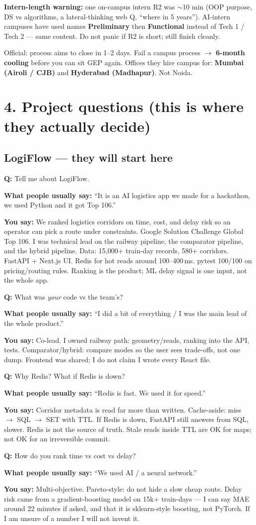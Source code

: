 \documentclass[a4paper,9.5pt]{extarticle}
\newcommand{\Q}[1]{\par\vspace{1.5pt}\noindent\textcolor{hot}{\textbf{Q:} #1}\par}
\newcommand{\Typ}[1]{\noindent\textcolor{muted}{\textbf{What people usually say:} #1}\par}
\newcommand{\Say}[1]{\noindent\textcolor{ok}{\textbf{You say:} #1}\par}
\begin{document}
\textbf{Intern-length warning:} one on-campus intern R2 was $\sim$10 min (OOP purpose, DS vs algorithms, a lateral-thinking web Q, ``where in 5 years''). AI-intern campuses have used names \textbf{Preliminary} then \textbf{Functional} instead of Tech 1 / Tech 2 --- same content. Do not panic if R2 is short; still finish cleanly.

Official: process aims to close in 1--2 days. Fail a campus process $\to$ \textbf{6-month cooling} before you can sit GEP again. Offices they hire campus for: \textbf{Mumbai (Airoli / CJB)} and \textbf{Hyderabad (Madhapur)}. Not Noida.

\section{4. Project questions (this is where they actually decide)}
\subsection{LogiFlow --- they will start here}
\Q{Tell me about LogiFlow.}
\Typ{``It is an AI logistics app we made for a hackathon, we used Python and it got Top 106.''}
\Say{We ranked logistics corridors on time, cost, and delay risk so an operator can pick a route under constraints. Google Solution Challenge Global Top 106. I was technical lead on the railway pipeline, the comparator pipeline, and the hybrid pipeline. Data: 15{,}000+ train-day records, 580+ corridors. FastAPI + Next.js UI. Redis for hot reads around 100--400\,ms. pytest 100/100 on pricing/routing rules. Ranking is the product; ML delay signal is one input, not the whole app.}

\Q{What was \emph{your} code vs the team's?}
\Typ{``I did a bit of everything / I was the main lead of the whole product.''}
\Say{Co-lead. I owned railway path: geometry/reads, ranking into the API, tests. Comparator/hybrid: compare modes so the user sees trade-offs, not one dump. Frontend was shared; I do not claim I wrote every React file.}

\Q{Why Redis? What if Redis is down?}
\Typ{``Redis is fast. We used it for speed.''}
\Say{Corridor metadata is read far more than written. Cache-aside: miss $\to$ SQL $\to$ SET with TTL. If Redis is down, FastAPI still answers from SQL, slower. Redis is not the source of truth. Stale reads inside TTL are OK for maps; not OK for an irreversible commit.}

\Q{How do you rank time vs cost vs delay?}
\Typ{``We used AI / a neural network.''}
\Say{Multi-objective. Pareto-style: do not hide a slow cheap route. Delay risk came from a gradient-boosting model on 15k+ train-days --- I can say MAE around 22 minutes if asked, and that it is sklearn-style boosting, not PyTorch. If I am unsure of a number I will not invent it.}
\end{document}

